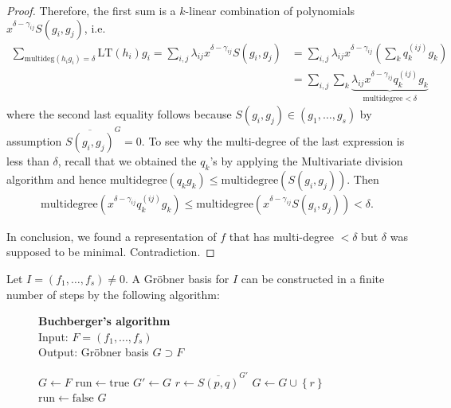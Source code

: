 \documentclass[a4paper, 11pt]{article}
\begin{document}
\begin{proof}
  Therefore, the first sum is a \( k \)-linear combination of polynomials \( x^{\delta - \gamma_{ij}} S( g_i, g_j) \), i.e.
  \begin{align*}
    \sum_{\mathrm{multideg}(h_ig_i) = \delta} \mathrm{LT}(h_i)g_i 
    = \sum_{i,j} \lambda_{ij} x^{\delta - \gamma_{ij}} S( g_i, g_j) &= \sum_{i,j} \lambda_{ij}x^{\delta - \gamma_{ij}}( \sum_k  q_k^{(ij)} g_k)\\ 
    &= \sum_{i,j} \sum_k \underbrace{\lambda_{ij}x^{\delta - \gamma_{ij}}   q_k^{(ij)} g_k}_{\mathrm{multidegree} < \delta}
  \end{align*}
  where the second last equality follows because \( S(g_i, g_j) \in (g_1, \dots, g_s) \) by assumption \( \overline{S(g_i, g_j)}^G = 0 \). To see why the multi-degree of the last expression is less than \( \delta \), recall that we obtained the \( q_k \)'s by applying the Multivariate division algorithm and hence \( \mathrm{multidegree}(q_k g_k) \leq \mathrm{multidegree}(S(g_i, g_j)) \). Then 
  \begin{align*}
    \mathrm{multidegree}(x^{\delta - \gamma_{ij}}q_k^{(ij)} g_k) \leq \mathrm{multidegree}(x^{\delta - \gamma_{ij}} S(g_i, g_j)) < \delta.
  \end{align*}
  
  In conclusion, we found a representation of \( f \) that has multi-degree \( < \delta \) but \( \delta \) was supposed to be minimal. Contradiction.
\end{proof}


\begin{prop}\label{buchbergersalg}
  Let \( I = (f_1, \dots, f_s) \neq 0 \). A Gröbner basis for \( I \) can be constructed in a finite number of steps by the following algorithm: 


\begin{figure}[H]
  \begin{mdframed}
    \textbf{Buchberger's algorithm}\\
    Input: \( F = (f_1,...,f_s) \)\\
    Output: Gröbner basis \( G \supset F \) 
  
    \begin{algorithmic}[1]
      \State \( G \gets F \) 
      \State \( \mathrm{run} \gets \mathrm{true} \)
          \State $G' \gets G$
            \State \( r \gets \overline{S(p,q)}^{G'} \)
              \State \( G \gets G \cup \left\{ r \right\} \)
            \EndIf
          \EndFor
            \State \( \mathrm{run} \gets \mathrm{false} \)
          \EndIf
      \EndWhile
      \State \Return \(G \)
    \end{algorithmic}
  \end{mdframed}
  \end{figure}
\end{prop}
\end{document}
